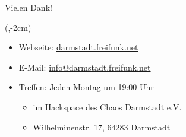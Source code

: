\documentclass[t]{beamer}
\begin{document}

  \begin{frame}{Vielen Dank!}
    \begin{textblock*}{0cm}(\textwidth-2cm,-2cm)
      \begin{figure}[h]
        \def\svgwidth{2.5cm}
        
      \end{figure}
    \end{textblock*}
      \begin{itemize}
        \item Webseite: \href{http://darmstadt.freifunk.net/}{darmstadt.freifunk.net}
        \item E-Mail: \href{info@darmstadt.freifunk.net}{info@darmstadt.freifunk.net}
        \item Treffen: Jeden Montag um 19:00 Uhr
        \begin{itemize}
          \item im Hackspace des Chaos Darmstadt e.V.
          \item Wilhelminenstr. 17, 64283 Darmstadt
        \end{itemize}
      \end{itemize}
      \vspace{1em}
  \end{frame}
\end{document}
